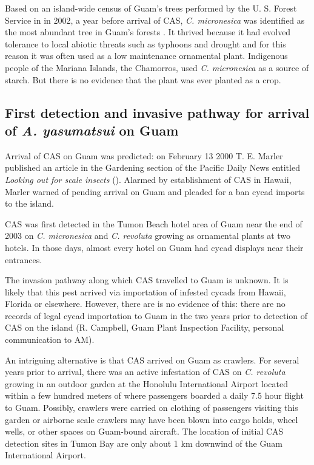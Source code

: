\documentclass[12pt,letterpaper,english,bibliography=totocnumbered, abstract=on]{scrartcl}
\begin{document}
Based on an island-wide census of Guam's trees performed by the U. S. Forest Service in in 2002, a year before arrival of CAS, \textit{C. micronesica} was identified as the most abundant tree in Guam's forests \cite{donnegon_guams_2004}. It thrived because it had evolved tolerance to local abiotic threats such as typhoons and drought and for this reason it was often used as a low maintenance ornamental plant. Indigenous people of the Mariana Islands, the Chamorros, used \textit{C. micronesica} as a source of starch. But there is no evidence that the plant was ever planted as a crop.   

\subsection{First detection and invasive pathway for arrival of \textit{A. yasumatsui} on Guam} 

Arrival of CAS on Guam was predicted: on February 13 2000 T. E. Marler published an article in the Gardening section of the Pacific Daily News entitled \textit{Looking out for scale insects} (\cite{haynesExoticInvasivePest2005}). Alarmed by establishment of CAS in Hawaii, Marler warned of pending arrival on Guam and pleaded for a ban cycad imports to the island. 

CAS was first detected in the Tumon Beach hotel area of Guam near the end of 2003 on \textit{C. micronesica} and \textit{C. revoluta} growing as ornamental plants at two hotels. In those days, almost every hotel on Guam had cycad displays near their entrances.

The invasion pathway along which CAS travelled to Guam is unknown.
It is likely that this pest arrived via importation of infested cycads from Hawaii, Florida or elsewhere. However, there are is no evidence of this: there are no records of legal cycad importation to Guam in the two years prior to detection of CAS on the island (R. Campbell, Guam Plant Inspection Facility, personal communication to AM).  

An intriguing alternative is that CAS arrived on Guam as crawlers. For several years prior to arrival, there was an active infestation of CAS on \textit{C. revoluta} growing in an outdoor garden at the Honolulu International Airport located within a few hundred meters of where passengers boarded a daily 7.5 hour flight to Guam. Possibly, crawlers were carried on clothing of passengers visiting this garden or airborne scale crawlers may have been blown into cargo holds, wheel wells, or other spaces on Guam-bound aircraft. The location of initial CAS detection sites in Tumon Bay are only about 1 km downwind of the Guam International Airport.
\end{document}
